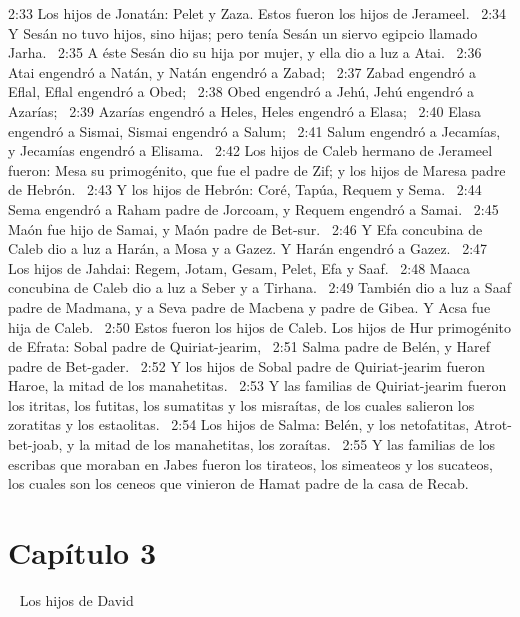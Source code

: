 2:33 Los hijos de Jonatán: Pelet y Zaza. Estos fueron los hijos de Jerameel.  
2:34 Y Sesán no tuvo hijos, sino hijas; pero tenía Sesán un siervo egipcio llamado Jarha.  
2:35 A éste Sesán dio su hija por mujer, y ella dio a luz a Atai.  
2:36 Atai engendró a Natán, y Natán engendró a Zabad;  
2:37 Zabad engendró a Eflal, Eflal engendró a Obed;  
2:38 Obed engendró a Jehú, Jehú engendró a Azarías;  
2:39 Azarías engendró a Heles, Heles engendró a Elasa;  
2:40 Elasa engendró a Sismai, Sismai engendró a Salum;  
2:41 Salum engendró a Jecamías, y Jecamías engendró a Elisama.  
2:42 Los hijos de Caleb hermano de Jerameel fueron: Mesa su primogénito, que fue el padre de Zif; y los hijos de Maresa padre de Hebrón.  
2:43 Y los hijos de Hebrón: Coré, Tapúa, Requem y Sema.  
2:44 Sema engendró a Raham padre de Jorcoam, y Requem engendró a Samai.  
2:45 Maón fue hijo de Samai, y Maón padre de Bet-sur.  
2:46 Y Efa concubina de Caleb dio a luz a Harán, a Mosa y a Gazez. Y Harán engendró a Gazez.  
2:47 Los hijos de Jahdai: Regem, Jotam, Gesam, Pelet, Efa y Saaf.  
2:48 Maaca concubina de Caleb dio a luz a Seber y a Tirhana.  
2:49 También dio a luz a Saaf padre de Madmana, y a Seva padre de Macbena y padre de Gibea. Y Acsa fue hija de Caleb.  
2:50 Estos fueron los hijos de Caleb. Los hijos de Hur primogénito de Efrata: Sobal padre de Quiriat-jearim,  
2:51 Salma padre de Belén, y Haref padre de Bet-gader.  
2:52 Y los hijos de Sobal padre de Quiriat-jearim fueron Haroe, la mitad de los manahetitas.  
2:53 Y las familias de Quiriat-jearim fueron los itritas, los futitas, los sumatitas y los misraítas, de los cuales salieron los zoratitas y los estaolitas.  
2:54 Los hijos de Salma: Belén, y los netofatitas, Atrot-bet-joab, y la mitad de los manahetitas, los zoraítas.  
2:55 Y las familias de los escribas que moraban en Jabes fueron los tirateos, los simeateos y los sucateos, los cuales son los ceneos que vinieron de Hamat padre de la casa de Recab.  
\section*{Capítulo 3} 
Los hijos de David  

